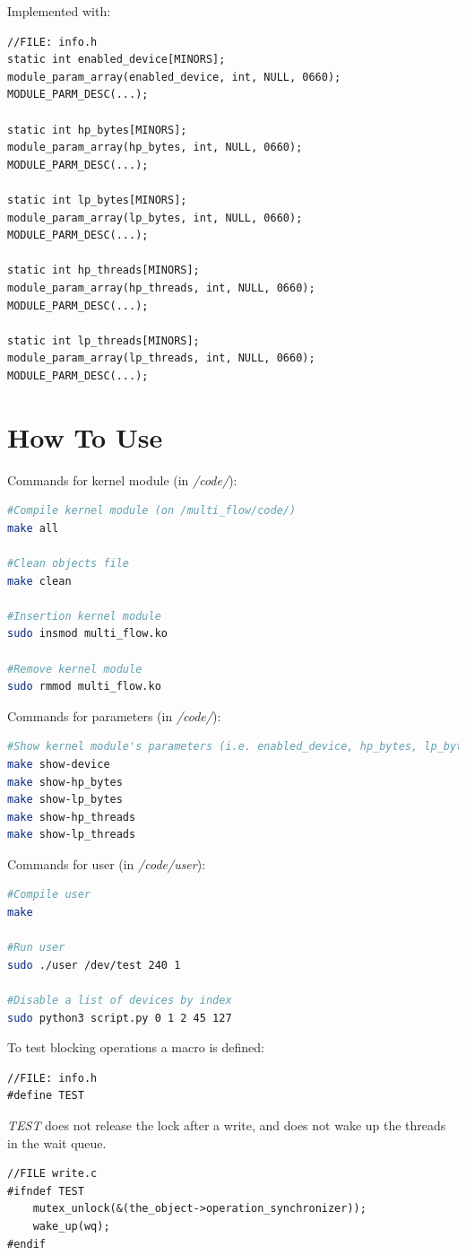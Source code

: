 \documentclass[12pt]{report}
\begin{document}
Implemented with:

\begin{lstlisting}
//FILE: info.h
static int enabled_device[MINORS];
module_param_array(enabled_device, int, NULL, 0660);
MODULE_PARM_DESC(...);

static int hp_bytes[MINORS];
module_param_array(hp_bytes, int, NULL, 0660);
MODULE_PARM_DESC(...);

static int lp_bytes[MINORS];
module_param_array(lp_bytes, int, NULL, 0660);
MODULE_PARM_DESC(...);

static int hp_threads[MINORS];
module_param_array(hp_threads, int, NULL, 0660);
MODULE_PARM_DESC(...);

static int lp_threads[MINORS];
module_param_array(lp_threads, int, NULL, 0660);
MODULE_PARM_DESC(...);
\end{lstlisting}
\chapter{How To Use}

Commands for kernel module (in \emph{/code/}): 

\begin{lstlisting}[language=Bash]
#Compile kernel module (on /multi_flow/code/)
make all

#Clean objects file
make clean

#Insertion kernel module
sudo insmod multi_flow.ko

#Remove kernel module
sudo rmmod multi_flow.ko
\end{lstlisting}

Commands for parameters (in \emph{/code/}): 

\begin{lstlisting}[language=Bash]
#Show kernel module's parameters (i.e. enabled_device, hp_bytes, lp_bytes, hp_threads, lp_threads)
make show-device
make show-hp_bytes
make show-lp_bytes
make show-hp_threads
make show-lp_threads
\end{lstlisting}

Commands for user (in \emph{/code/user}): 

\begin{lstlisting}[language=Bash]
#Compile user
make

#Run user 
sudo ./user /dev/test 240 1

#Disable a list of devices by index
sudo python3 script.py 0 1 2 45 127
\end{lstlisting}

To test blocking operations a macro is defined: 

\begin{lstlisting}
//FILE: info.h
#define TEST
\end{lstlisting}

\emph{TEST} does not release the lock after a write, and does not wake up the  threads in the wait queue. 

\begin{lstlisting}
//FILE write.c
#ifndef TEST   
	mutex_unlock(&(the_object->operation_synchronizer));
	wake_up(wq);
#endif
\end{lstlisting}
\end{document}

